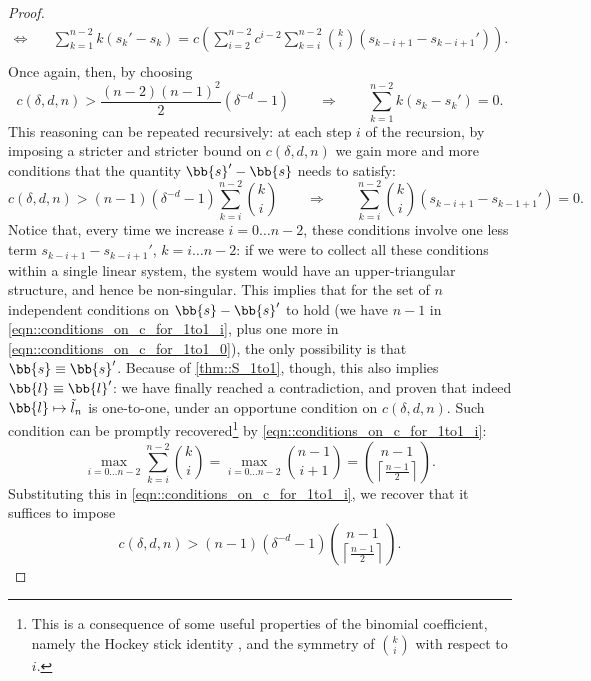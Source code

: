 \begin{proof}
\begin{equation}
\begin{split}
    \Longleftrightarrow\quad& \sum_{k=1}^{n-2}k(s_{k}'-s_{k}) = c\left(\sum_{i=2}^{n-2}c^{i-2}\sum_{k=i}^{n-2}\binom{k}{i}(s_{k-i+1}-s_{k-i+1}')\right).\\
\end{split}
    \label{}
\end{equation}
Once again, then, by choosing 
\begin{equation}
    c(\delta,d,n)>\frac{(n-2)(n-1)^2}{2}(\delta^{-d}-1)\qquad\Longrightarrow\qquad\sum_{k=1}^{n-2}k(s_{k}-s_{k}')=0.
\end{equation}
This reasoning can be repeated recursively: at each step $i$ of the recursion, by imposing a stricter and stricter bound on $c(\delta,d,n)$ we gain more and more conditions that the quantity $\bb{s}'-\bb{s}$ needs to satisfy:
\begin{equation}
    c(\delta,d,n)>(n-1)(\delta^{-d}-1)\sum_{k=i}^{n-2}\binom{k}{i}\qquad\Longrightarrow\qquad\sum_{k=i}^{n-2}\binom{k}{i}(s_{k-i+1}-s_{k-1+1}') = 0.
    \label{eqn::conditions_on_c_for_1to1_i}
\end{equation}
Notice that, every time we increase $i=0\dots n-2$, these conditions involve one less term $s_{k-i+1}-s_{k-i+1}'$, $k=i\dots n-2$: if we were to collect all these conditions within a single linear system, the system would have an upper-triangular structure, and hence be non-singular. This implies that for the set of $n$ independent conditions on $\bb{s}-\bb{s}'$ to hold (we have $n-1$ in \cref{eqn::conditions_on_c_for_1to1_i}, plus one more in \cref{eqn::conditions_on_c_for_1to1_0}), the only possibility is that $\bb{s}\equiv\bb{s}'$. Because of \cref{thm::S_1to1}, though, this also implies $\bb{l}\equiv\bb{l}'$: we have finally reached a contradiction, and proven that indeed $\bb{l}\mapsto\tilde{l}_n$ is one-to-one, under an opportune condition on $c(\delta,d,n)$.
Such condition can be promptly recovered\footnote{This is a consequence of some useful properties of the binomial coefficient, namely the Hockey stick identity \cite{HockeyStick}, and the symmetry of $\binom{k}{i}$ with respect to $i$.} by \cref{eqn::conditions_on_c_for_1to1_i}:
\begin{equation}
    \max_{i=0 \dots n-2}\sum_{k=i}^{n-2}\binom{k}{i} =\max_{i=0 \dots n-2}\binom{n-1}{i+1}=\binom{n-1}{\left\lceil\frac{n-1}{2}\right\rceil}.
    \label{eqn::max_binomial}
\end{equation}
Substituting this in \cref{eqn::conditions_on_c_for_1to1_i}, we recover that it suffices to impose
\begin{equation}
    c(\delta,d,n)>(n-1)(\delta^{-d}-1)\binom{n-1}{\left\lceil\frac{n-1}{2}\right\rceil}.
\end{equation}
\end{proof}

